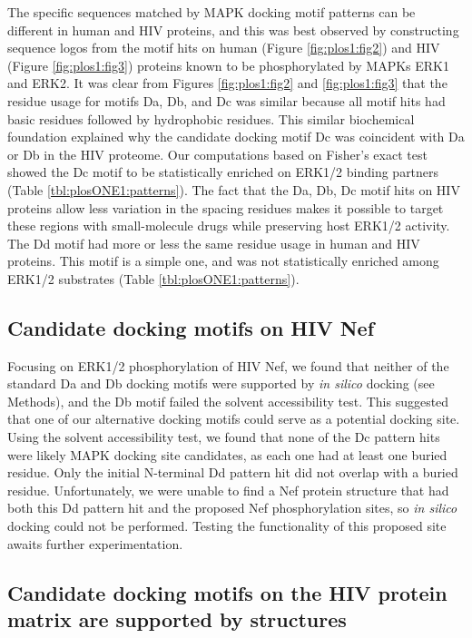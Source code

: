 The specific sequences matched by MAPK docking motif patterns can be
different in human and HIV proteins, and this was best observed by
constructing sequence logos from the motif hits on human (Figure
\ref{fig:plos1:fig2}) and HIV (Figure \ref{fig:plos1:fig3}) proteins
known to be phosphorylated by MAPKs ERK1 and ERK2. It was clear from
Figures \ref{fig:plos1:fig2} and ​\ref{fig:plos1:fig3} that the residue
usage for motifs Da, Db, and Dc was similar because all motif hits had
basic residues followed by hydrophobic residues. This similar
biochemical foundation explained why the candidate docking motif Dc
was coincident with Da or Db in the HIV proteome. Our computations
based on Fisher's exact test showed the Dc motif to be statistically
enriched on ERK1/2 binding partners (Table
\ref{tbl:plosONE1:patterns}). The fact that the Da, Db, Dc motif hits
on HIV proteins allow less variation in the spacing residues makes it
possible to target these regions with small-molecule drugs while
preserving host ERK1/2 activity. The Dd motif had more or less the
same residue usage in human and HIV proteins. This motif is a simple
one, and was not statistically enriched among ERK1/2 substrates (Table
\ref{tbl:plosONE1:patterns}).

\subsection{Candidate docking motifs on HIV Nef}

Focusing on ERK1/2 phosphorylation of HIV Nef, we found that neither
of the standard Da and Db docking motifs were supported by \textit{in silico}
docking (see Methods), and the Db motif failed the solvent
accessibility test. This suggested that one of our alternative docking
motifs could serve as a potential docking site. Using the solvent
accessibility test, we found that none of the Dc pattern hits were
likely MAPK docking site candidates, as each one had at least one
buried residue. Only the initial N-terminal Dd pattern hit did not
overlap with a buried residue. Unfortunately, we were unable to find a
Nef protein structure that had both this Dd pattern hit and the
proposed Nef phosphorylation sites, so \textit{in silico} docking could not be
performed. Testing the functionality of this proposed site awaits
further experimentation.

\subsection{Candidate docking motifs on the HIV protein matrix are supported by structures}

